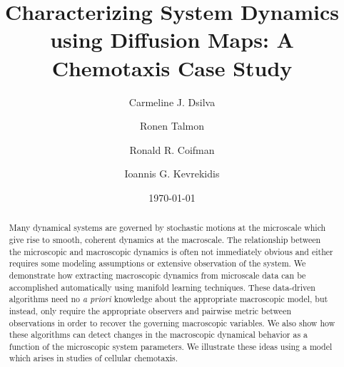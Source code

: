 \documentclass[prl, reprint]{revtex4-1}
\begin{document}
\title{Characterizing System Dynamics using Diffusion Maps: A Chemotaxis Case Study}

\author{Carmeline J. Dsilva}

\author{Ronen Talmon}

\author{Ronald R. Coifman}

\author{Ioannis G. Kevrekidis}

\date{\today}

\begin{abstract}

Many dynamical systems are governed by stochastic motions at the microscale which give rise to smooth, coherent dynamics at the macroscale.
%
The relationship between the microscopic and macroscopic dynamics is often not immediately obvious and either requires some modeling assumptions or extensive observation of the system.
%
We demonstrate how extracting macroscopic dynamics from microscale data can be accomplished automatically using manifold learning techniques. 
%
These data-driven algorithms need no {\em a priori} knowledge about the appropriate macroscopic model, but instead, only require the appropriate observers and pairwise metric between observations in order to recover the governing macroscopic variables.
%
We also show how these algorithms can detect changes in the macroscopic dynamical behavior as a function of the microscopic system parameters. 
%
We illustrate these ideas using a model which arises in studies of cellular chemotaxis.

\end{abstract}


\maketitle

 
\end{document}
